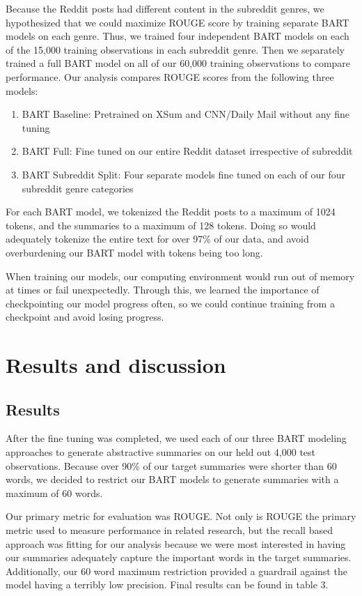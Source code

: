 \documentclass[11pt,a4paper, twocolumn]{article}
\begin{document}
Because the Reddit posts had different content in the subreddit genres, 
we hypothesized that we could maximize ROUGE score by training separate BART models on each genre.
Thus, we trained four independent BART models on each of the 15,000 training observations in each subreddit genre. 
Then we separately trained a full BART model on all of our 60,000 training observations to compare performance. 
Our analysis compares ROUGE scores from the following three models:

\begin{enumerate}
  \item BART Baseline: Pretrained on XSum and CNN/Daily Mail without any fine tuning
  \item BART Full: Fine tuned on our entire Reddit dataset irrespective of subreddit
  \item BART Subreddit Split: Four separate models fine tuned on each of our four subreddit genre categories
\end{enumerate}

For each BART model, we tokenized the Reddit posts to a maximum of 1024 tokens, and the summaries to a maximum of 128 tokens. 
Doing so would adequately tokenize the entire text for over 97\% of our data, and avoid overburdening our BART model with tokens being too long. 

When training our models, our computing environment would run out of memory at times or fail unexpectedly. 
Through this, we learned the importance of checkpointing our model progress often, so we could continue training from a checkpoint and avoid losing progress. 

\section{Results and discussion}

\subsection{Results}

After the fine tuning was completed, we used each of our three BART modeling approaches to generate abstractive summaries on 
our held out 4,000 test observations. Because over 90\% of our target summaries were shorter than 60 words, we decided to 
restrict our BART models to generate summaries with a maximum of 60 words. 

Our primary metric for evaluation was ROUGE. 
Not only is ROUGE the primary metric used to measure performance in related research, 
but the recall based approach was fitting for our analysis because we were most interested in having our summaries adequately capture the important words in the target summaries. 
Additionally, our 60 word maximum restriction provided a guardrail against the model having a terribly low precision.
Final results can be found in table 3. 
\end{document}
